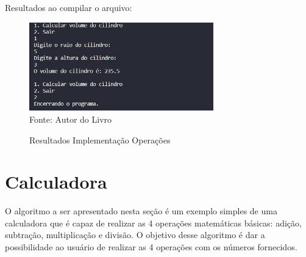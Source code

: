 	Resultados ao compilar o arquivo:
	
	\begin{figure}[H]
		\centering
		\caption{Resultados Implementação Operações}
		\label{Resultados Implementação Operações}
		\includegraphics[width=8cm]{Pictures/ResOperac.jpg} \\
		Fonte: Autor do Livro
	\end{figure}


    \section{Calculadora}
    
   	O algoritmo a ser apresentado nesta seção é um exemplo simples de uma calculadora que é capaz de realizar as 4 operações matemáticas básicas: adição, subtração, multiplicação e divisão. O objetivo desse algoritmo é dar a possibilidade ao usuário de realizar as 4 operações com os números fornecidos.  
    

